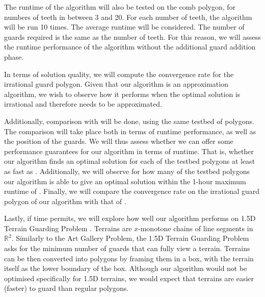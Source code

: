 The runtime of the algorithm will also be tested on the comb polygon, for  numbers of teeth in between 3 and 20. For each number of teeth, the algorithm will be run 10 times. The average runtime will be considered. The number of guards required is the same as the number of teeth. For this reason, we will assess the runtime performance of the algorithm without the additional guard addition phase. 

In terms of solution quality, we will compute the convergence rate for the irrational guard polygon. Given that our algorithm is an approximation algorithm, we wish to observe how it performs when the optimal solution is irrational and therefore needs to be approximated.

Additionally, comparison with \cite{DBLP:journals/corr/abs-2007-06920} will be done, using the same testbed of polygons. The comparison will take place both in terms of runtime performance, as well as the position of the guards. We will thus assess whether we can offer some performance guarantees for our algorithm in terms of runtime. That is, whether our algorithm finds an optimal solution for each of the testbed polygons at least as fast as \cite{DBLP:journals/corr/abs-2007-06920}. Additionally, we will observe for how many of the testbed polygons our algorithm is able to give an optimal solution within the 1-hour maximum runtime of \cite{DBLP:journals/corr/abs-2007-06920}. Finally, we will compare the convergence rate on the irrational guard polygon of our algorithm with that of \cite{DBLP:journals/corr/abs-2007-06920}.

Lastly, if time permits, we will explore how well our algorithm performs on 1.5D Terrain Guarding Problem \cite{https://doi.org/10.48550/arxiv.1509.08285}. Terrains are $x$-monotone chains of line segments in $\mathbb R^2$. Similarly to the Art Gallery Problem, the 1.5D Terrain Guarding Problem asks for the minimum number of guards that can fully view a terrain. Terrains can be then converted into polygons by framing them in a box, with the terrain itself as the lower boundary of the box. Although our algorithm would not be optimised specifically for 1.5D terrains, we would expect that terrains are easier (faster) to guard than regular polygons.



